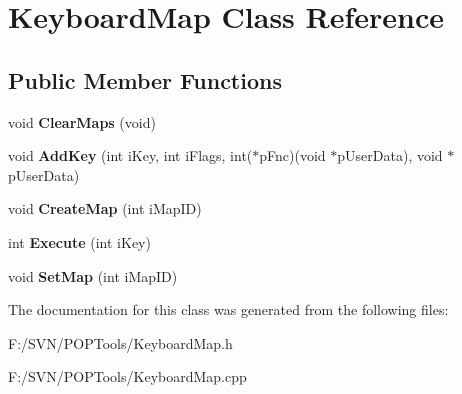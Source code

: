 \hypertarget{class_keyboard_map}{\section{Keyboard\-Map Class Reference}
\label{class_keyboard_map}
}
\subsection*{Public Member Functions}
\begin{DoxyCompactItemize}
\item 
\hypertarget{class_keyboard_map_aaefaa573454aab1ab6c5d33254a07770}{void {\bfseries Clear\-Maps} (void)}\label{class_keyboard_map_aaefaa573454aab1ab6c5d33254a07770}

\item 
\hypertarget{class_keyboard_map_ab7e85dae16117a99357240e777cd1ed6}{void {\bfseries Add\-Key} (int i\-Key, int i\-Flags, int($\ast$p\-Fnc)(void $\ast$p\-User\-Data), void $\ast$p\-User\-Data)}\label{class_keyboard_map_ab7e85dae16117a99357240e777cd1ed6}

\item 
\hypertarget{class_keyboard_map_aaf60f8316097101b7e48fc6f2aa90a14}{void {\bfseries Create\-Map} (int i\-Map\-I\-D)}\label{class_keyboard_map_aaf60f8316097101b7e48fc6f2aa90a14}

\item 
\hypertarget{class_keyboard_map_ac2f3a764de1cd597aec8f099afdcc123}{int {\bfseries Execute} (int i\-Key)}\label{class_keyboard_map_ac2f3a764de1cd597aec8f099afdcc123}

\item 
\hypertarget{class_keyboard_map_a07af1aea275ae7c373ef19fc6df4ea14}{void {\bfseries Set\-Map} (int i\-Map\-I\-D)}\label{class_keyboard_map_a07af1aea275ae7c373ef19fc6df4ea14}

\end{DoxyCompactItemize}


The documentation for this class was generated from the following files\-:\begin{DoxyCompactItemize}
\item 
F\-:/\-S\-V\-N/\-P\-O\-P\-Tools/Keyboard\-Map.\-h\item 
F\-:/\-S\-V\-N/\-P\-O\-P\-Tools/Keyboard\-Map.\-cpp\end{DoxyCompactItemize}
